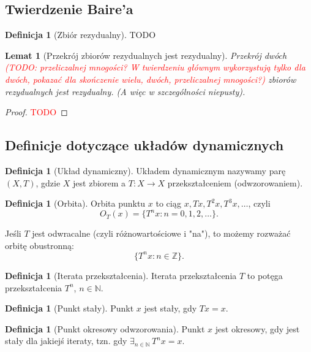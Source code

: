 \documentclass[licencjacka]{pwr_wmat_praca_dyplomowa}
\theoremstyle{plain}
\numberwithin{theorem}{chapter}
\newtheorem{lemma}[theorem]{Lemat}
\theoremstyle{definition}
\numberwithin{theorem}{chapter}
\newtheorem{definition}[theorem]{Definicja}
\begin{document}
\subsection{Twierdzenie Baire'a}

\begin{definition}[Zbiór rezydualny]
TODO
\end{definition}


\begin{lemma}[Przekrój zbiorów rezydualnych jest rezydualny] \label{przekroj_rezydualnych_jest_rezydualny}
Przekrój dwóch \textcolor{red}{(TODO: przeliczalnej mnogości? W twierdzeniu głównym wykorzystują tylko dla dwóch, pokazać dla skończenie wielu, dwóch, przeliczalnej mnogości?)} zbiorów rezydualnych jest rezydualny. (A więc w szczególności niepusty).
\end{lemma}

\begin{proof}
\textcolor{red}{TODO}
\end{proof}



\subsection{Definicje dotyczące układów dynamicznych}

\begin{definition}[Układ dynamiczny]
Układem dynamicznym nazywamy parę $(X, T)$, gdzie $X$ jest zbiorem a $T:X \rightarrow X$ przekształceniem (odwzorowaniem).
\end{definition}

\begin{definition}[Orbita]
Orbita punktu $x$ to ciąg $x, Tx, T^2x, T^3x,\ldots$, czyli 
$$O_T(x) = \{T^nx: n=0,1,2,\ldots\}.$$

Jeśli $T$ jest odwracalne (czyli różnowartościowe i "na"), to możemy rozważać orbitę obustronną:
$$\{T^nx: n \in \mathbb{Z}\}.$$
\end{definition}

\begin{definition}[Iterata przekształcenia]
Iterata przekształcenia $T$ to potęga przekształcenia $T^n$, $n \in \mathbb{N}$.
\end{definition}

\begin{definition}[Punkt stały]
Punkt $x$ jest stały, gdy $Tx = x$.
\end{definition}

\begin{definition}[Punkt okresowy odwzorowania]
Punkt $x$ jest okresowy, gdy jest stały dla jakiejś iteraty, tzn. gdy $\exists_{n \in \mathbb{N}} \, T^nx = x$.
\end{definition}
\end{document}
